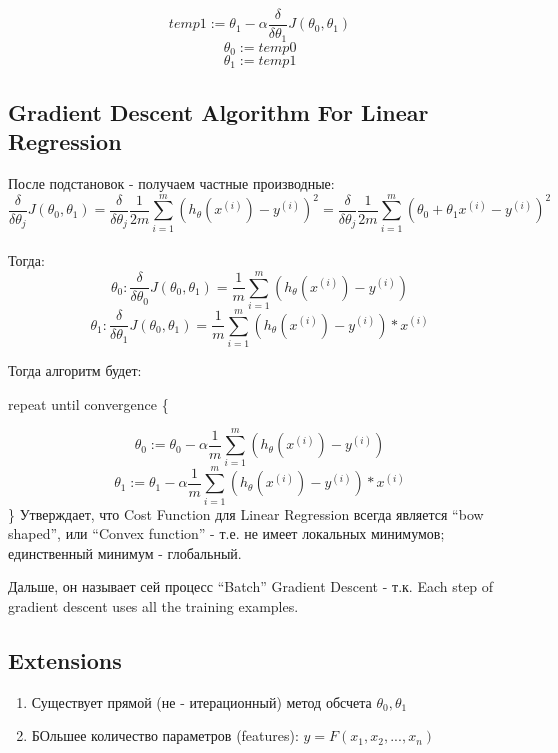 \documentclass{scrartcl}
\begin{document}
\[temp1 := \theta_1 - \alpha \frac {\delta}{\delta \theta_1}
J(\theta_0,\theta_1)\]
\[\theta_0 := temp0 \]
\[\theta_1 := temp1 \]

\subsection {Gradient Descent Algorithm For Linear Regression }
\label {2-7}
После подстановок - получаем частные производные:
\[ \frac {\delta}{\delta \theta_j} J(\theta_0, \theta_1) = \frac
{\delta}{\delta \theta_j} \frac{1}{2m} \sum\limits_{i=1}^m\left(
  h_\theta (x^{(i)}) - y^{(i)} \right)^2 = \frac {\delta}{\delta
  \theta_j} \frac{1}{2m} \sum\limits_{i=1}^m\left(\theta_0 + \theta_1
  x^{(i)} - y^{(i)} \right)^2
\] \\
Тогда:
\[
\theta_0 : \frac {\delta}{\delta \theta_0} J(\theta_0, \theta_1) =
\frac{1}{m} \sum\limits_{i=1}^m\left(h_\theta (x^{(i)}) - y^{(i)}
\right) \]
\[
\theta_1 : \frac {\delta}{\delta \theta_1} J(\theta_0, \theta_1) =
\frac{1}{m} \sum\limits_{i=1}^m\left(h_\theta (x^{(i)}) - y^{(i)}
\right) * x^{(i)} \]

Тогда алгоритм будет:


repeat until convergence \{


\[\theta_0 := \theta_0 - {\alpha} \frac{1}{m}
\sum\limits_{i=1}^m\left(h_\theta (x^{(i)}) - y^{(i)} \right) \]
\[\theta_1 := \theta_1 - {\alpha} \frac{1}{m}
\sum\limits_{i=1}^m\left(h_\theta (x^{(i)}) - y^{(i)} \right) *
x^{(i)} \] \} Утверждает, что Cost Function для Linear Regression
всегда является ``bow shaped'', или ``Convex function'' - т.е. не
имеет локальных минимумов; единственный минимум - глобальный.

Дальше, он называет сей процесс ``Batch'' Gradient Descent - т.к. Each
step of gradient descent uses all the training examples.

\subsection {Extensions}
\label {2-8}
\begin{enumerate}
\item Существует прямой (не - итерационный) метод обсчета $\theta_0,
  \theta_1$
\item БОльшее количество параметров (features): $y = F(x_1, x_2, ...,
  x_n)$
\end{enumerate}

\label{Chapter 3}
\end{document}
